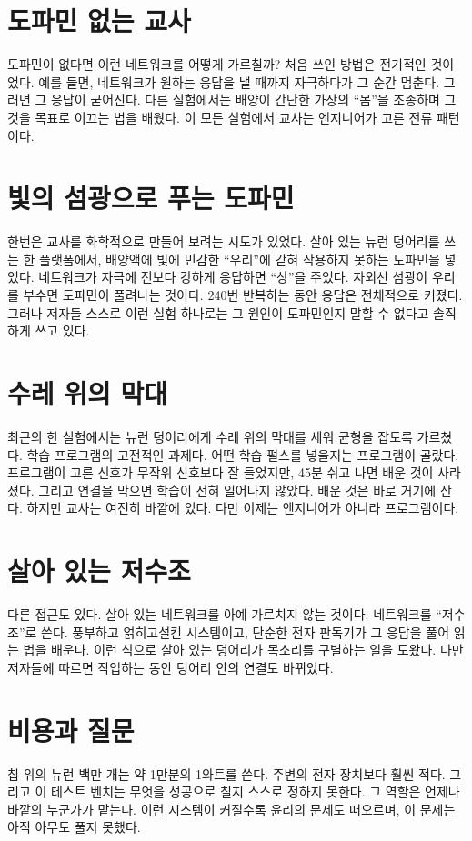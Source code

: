 \section*{도파민 없는 교사}

도파민이 없다면 이런 네트워크를 어떻게 가르칠까? 처음 쓰인 방법은 전기적인 것이었다. 예를 들면, 네트워크가 원하는 응답을 낼 때까지 자극하다가 그 순간 멈춘다. 그러면 그 응답이 굳어진다. 다른 실험에서는 배양이 간단한 가상의 “몸”을 조종하며 그것을 목표로 이끄는 법을 배웠다. 이 모든 실험에서 교사는 엔지니어가 고른 전류 패턴이다.

\section*{빛의 섬광으로 푸는 도파민}

한번은 교사를 화학적으로 만들어 보려는 시도가 있었다. 살아 있는 뉴런 덩어리를 쓰는 한 플랫폼에서, 배양액에 빛에 민감한 “우리”에 갇혀 작용하지 못하는 도파민을 넣었다. 네트워크가 자극에 전보다 강하게 응답하면 “상”을 주었다. 자외선 섬광이 우리를 부수면 도파민이 풀려나는 것이다. 240번 반복하는 동안 응답은 전체적으로 커졌다. 그러나 저자들 스스로 이런 실험 하나로는 그 원인이 도파민인지 말할 수 없다고 솔직하게 쓰고 있다.

\section*{수레 위의 막대}

최근의 한 실험에서는 뉴런 덩어리에게 수레 위의 막대를 세워 균형을 잡도록 가르쳤다. 학습 프로그램의 고전적인 과제다. 어떤 학습 펄스를 넣을지는 프로그램이 골랐다. 프로그램이 고른 신호가 무작위 신호보다 잘 들었지만, 45분 쉬고 나면 배운 것이 사라졌다. 그리고  연결을 막으면 학습이 전혀 일어나지 않았다. 배운 것은 바로 거기에 산다. 하지만 교사는 여전히 바깥에 있다. 다만 이제는 엔지니어가 아니라 프로그램이다.

\section*{살아 있는 저수조}

다른 접근도 있다. 살아 있는 네트워크를 아예 가르치지 않는 것이다. 네트워크를 “저수조”로 쓴다. 풍부하고 얽히고설킨 시스템이고, 단순한 전자 판독기가 그 응답을 풀어 읽는 법을 배운다. 이런 식으로 살아 있는 덩어리가 목소리를 구별하는 일을 도왔다. 다만 저자들에 따르면 작업하는 동안 덩어리 안의 연결도 바뀌었다.

\section*{비용과 질문}

칩 위의 뉴런 백만 개는 약 1만분의 1와트를 쓴다. 주변의 전자 장치보다 훨씬 적다. 그리고 이 테스트 벤치는 무엇을 성공으로 칠지 스스로 정하지 못한다. 그 역할은 언제나 바깥의 누군가가 맡는다. 이런 시스템이 커질수록 윤리의 문제도 떠오르며, 이 문제는 아직 아무도 풀지 못했다.

